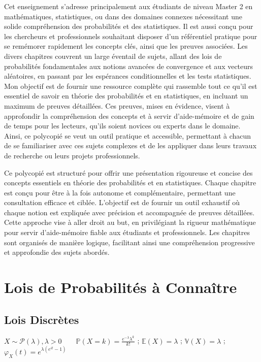 \documentclass[12pt]{article}
\newcommand{\shift}{\hspace{2em}}
\newcommand{\pois}[1]{\mathcal{P}(#1)} %
\newcommand{\1}{\bb{1}} %
\begin{document}
Cet enseignement s'adresse principalement aux étudiants de niveau Master 2 en mathématiques, statistiques, ou dans des domaines connexes nécessitant une solide compréhension des probabilités et des statistiques. Il est aussi conçu pour les chercheurs et professionnels souhaitant disposer d'un référentiel pratique pour se remémorer rapidement les concepts clés, ainsi que les preuves associées. Les divers chapitres couvrent un large éventail de sujets, allant des lois de probabilités fondamentales aux notions avancées de convergence et aux vecteurs aléatoires, en passant par les espérances conditionnelles et les tests statistiques. Mon objectif est de fournir une ressource complète qui rassemble tout ce qu'il est essentiel de savoir en théorie des probabilités et en statistiques, en incluant un maximum de preuves détaillées. Ces preuves, mises en évidence, visent à approfondir la compréhension des concepts et à servir d'aide-mémoire et de gain de temps pour les lecteurs, qu'ils soient novices ou experts dans le domaine. Ainsi, ce polycopié se veut un outil pratique et accessible, permettant à chacun de se familiariser avec ces sujets complexes et de les appliquer dans leurs travaux de recherche ou leurs projets professionnels.

Ce polycopié est structuré pour offrir une présentation rigoureuse et concise des concepts essentiels en théorie des probabilités et en statistiques. Chaque chapitre est conçu pour être à la fois autonome et complémentaire, permettant une consultation efficace et ciblée. L'objectif est de fournir un outil exhaustif où chaque notion est expliquée avec précision et accompagnée de preuves détaillées. Cette approche vise à aller droit au but, en privilégiant la rigueur mathématique pour servir d'aide-mémoire fiable aux étudiants et professionnels. Les chapitres sont organisés de manière logique, facilitant ainsi une compréhension progressive et approfondie des sujets abordés.



\newpage

\section{Lois de Probabilités à Connaître}

\subsection{Lois Discrètes}

$\boxed{X \sim \pois{\lambda}, \lambda>0} \shift \mathbb{P}(X=k)= \frac{e^{-\lambda}\lambda^k}{k!}$ ; $\mathbb{E}(X)=\lambda$ ;  $\mathbb{V}(X)=\lambda$ ; $\varphi_X(t)=e^{\lambda(e^{it}-1)}$\vspace{2em}
\end{document}
